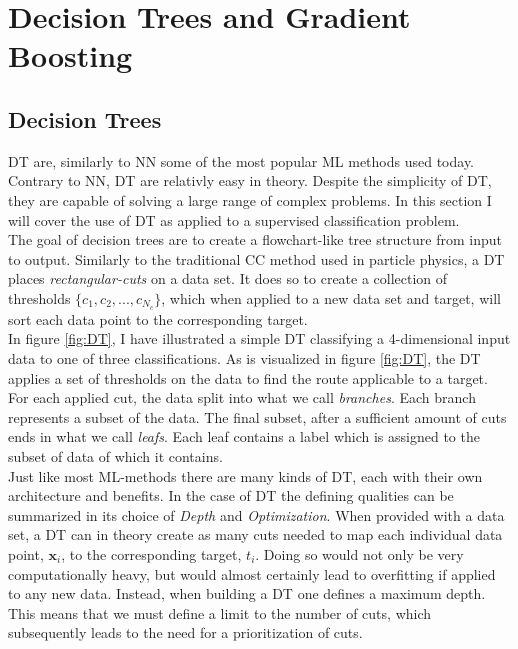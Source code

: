 \section{Decision Trees and Gradient Boosting}
\subsection{Decision Trees}
\acf{DT} are, similarly to \ac{NN} some of the most popular \ac{ML} methods used today.
Contrary to \ac{NN}, \ac{DT} are relativly easy in theory. Despite the simplicity of \ac{DT}, 
they are capable of solving a large range of complex problems. In this section I will cover the use 
of \ac{DT} as applied to a supervised classification problem.
\\
The goal of decision trees are to create a flowchart-like tree structure from input to output. 
Similarly to the traditional \ac{CC} method used in particle physics, a \ac{DT} 
places \emph{rectangular-cuts} on a data set. It does so to create a collection of thresholds 
$\{c_1, c_2,...,c_{N_c}\}$, which when applied to a new data set and target, 
will sort each data point to the corresponding target. 
\\
In figure \ref{fig:DT}, I have illustrated a simple \ac{DT} classifying a 4-dimensional 
input data to one of three classifications. As is visualized in figure \ref{fig:DT}, the \ac{DT} 
applies a set of thresholds on the data to find the route applicable to a target. For each applied 
cut, the data split into what we call \emph{branches}. Each branch represents a subset of the data.
The final subset, after a sufficient amount of cuts ends in what we call \emph{leafs}. Each leaf contains
a label which is assigned to the subset of data of which it contains.
\\  
Just like most \ac{ML}-methods there are many kinds of \ac{DT}, each with their own 
architecture and benefits. In the case of \ac{DT} the defining qualities can be summarized in
its choice of \emph{Depth} and \emph{Optimization}. When provided with a data set,
a \ac{DT} can in theory create as many cuts needed to map each individual data point, $\textbf{x}_i$, to the 
corresponding target, $t_i$. Doing so would not only be very computationally heavy, but would almost 
certainly lead to overfitting if applied to any new data. Instead, when building a \ac{DT} one defines 
a maximum depth. This means that we must define a limit to the number of cuts, which 
subsequently leads to the need for a prioritization of cuts. 
\\
